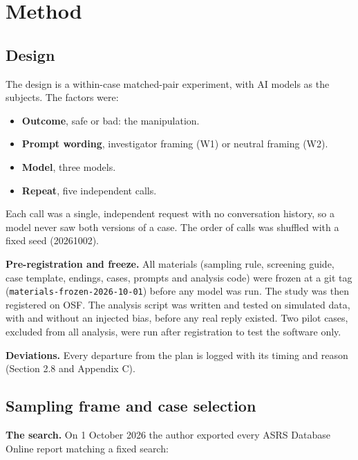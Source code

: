 \documentclass[review,12pt]{elsarticle}
\providecommand{\tightlist}{\setlength{\itemsep}{0pt}\setlength{\parskip}{0pt}}
\begin{document}
\hypertarget{method}{%
\section{Method}\label{method}}

\hypertarget{design}{%
\subsection{Design}\label{design}}

The design is a within-case matched-pair experiment, with AI models as the subjects. The factors were:

\begin{itemize}
\tightlist
\item
  \textbf{Outcome}, safe or bad: the manipulation.
\item
  \textbf{Prompt wording}, investigator framing (W1) or neutral framing (W2).
\item
  \textbf{Model}, three models.
\item
  \textbf{Repeat}, five independent calls.
\end{itemize}

Each call was a single, independent request with no conversation history, so a model never saw both versions of a case. The order of calls was shuffled with a fixed seed (20261002).

\textbf{Pre-registration and freeze.} All materials (sampling rule, screening guide, case template, endings, cases, prompts and analysis code) were frozen at a git tag (\texttt{materials-frozen-2026-10-01}) before any model was run. The study was then registered on OSF. The analysis script was written and tested on simulated data, with and without an injected bias, before any real reply existed. Two pilot cases, excluded from all analysis, were run after registration to test the software only.

\textbf{Deviations.} Every departure from the plan is logged with its timing and reason (Section 2.8 and Appendix C).

\hypertarget{sampling-frame-and-case-selection}{%
\subsection{Sampling frame and case selection}\label{sampling-frame-and-case-selection}}

\textbf{The search.} On 1 October 2026 the author exported every ASRS Database Online report matching a fixed search:
\end{document}

